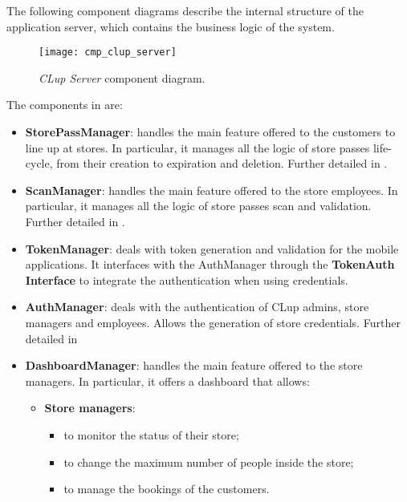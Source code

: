 The following component diagrams describe the internal structure of the application server, which contains the business logic of the system.

\begin{figure}[H]
	\centering
	\texttt{[image: cmp\_clup\_server]}
	\caption{\textit{CLup Server} component diagram.}
	\label{fig:cmp_clup_server}
\end{figure}
\clearpage

The components in  are:
\begin{itemize}
	\item \textbf{StorePassManager}: handles the main feature offered to the customers to line up at stores. In particular, it manages all the logic of store passes life-cycle, from their creation to expiration and deletion. Further detailed in .
	
	\item \textbf{ScanManager}: handles the main feature offered to the store employees. In particular, it manages all the logic of store passes scan and validation. Further detailed in .
	
	\item \textbf{TokenManager}: deals with token generation and validation for the mobile applications. It interfaces with the AuthManager through the \textbf{TokenAuth Interface} to integrate the authentication when using credentials.
	
	\item \textbf{AuthManager}: deals with the authentication of CLup admins, store managers and employees. Allows the generation of store credentials. Further detailed in 
	
	\item \textbf{DashboardManager}: handles the main feature offered to the store managers. In particular, it offers a dashboard that allows:
	\begin{itemize}
		\item \textbf{Store managers}:
				\begin{itemize}
					\item to monitor the status of their store;
					\item to change the maximum number of people inside the store;
					\item to manage the bookings of the customers.
				\end{itemize}
			

\end{itemize}
\end{itemize}
